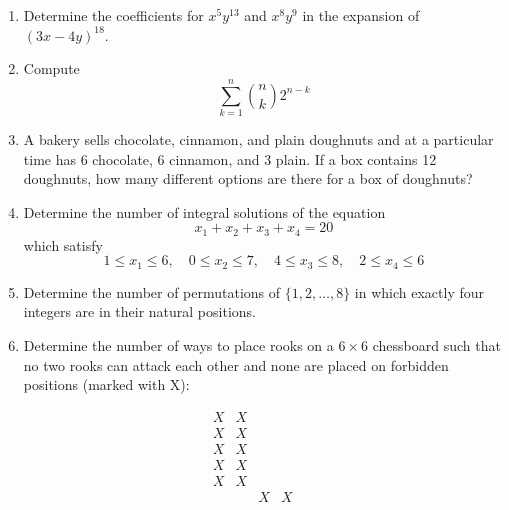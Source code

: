 \documentclass{article}
\theoremstyle{definition}
\begin{document}
\pagestyle{fancy}
\begin{enumerate}
    \item Determine the coefficients for $x^5 y^{13}$ and $x^8 y^9$ in the expansion of $(3x - 4y)^{18}$.

    \item Compute
    \[
    \sum_{k=1}^{n} \binom{n}{k} 2^{n - k}
    \]

    \item A bakery sells chocolate, cinnamon, and plain doughnuts and at a particular time has 6 chocolate, 6 cinnamon, and 3 plain. If a box contains 12 doughnuts, how many different options are there for a box of doughnuts?

    \item Determine the number of integral solutions of the equation
    \[
    x_1 + x_2 + x_3 + x_4 = 20
    \]
    which satisfy
    \[
    1 \leq x_1 \leq 6, \quad 0 \leq x_2 \leq 7, \quad 4 \leq x_3 \leq 8, \quad 2 \leq x_4 \leq 6
    \]

    \item Determine the number of permutations of $\{1, 2, \ldots, 8\}$ in which exactly four integers are in their natural positions.

    \item Determine the number of ways to place rooks on a $6 \times 6$ chessboard such that no two rooks can attack each other and none are placed on forbidden positions (marked with X):
    
    \[
    \begin{array}{cccccc}
    X & X &   &   &   &   \\
    X & X &   &   &   &   \\
    X & X &   &   &   &   \\
    X & X &   &   &   &   \\
    X & X &   &   &   &   \\
      &   & X & X &   &   \\
    \end{array}
    \]
    
\end{enumerate}
\end{document}
